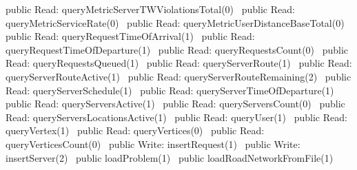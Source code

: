 public \LA{}Read: queryMetricServerTWViolationsTotal(0)~{\nwtagstyle{}}\RA{}
public \LA{}Read: queryMetricServiceRate(0)~{\nwtagstyle{}}\RA{}
public \LA{}Read: queryMetricUserDistanceBaseTotal(0)~{\nwtagstyle{}}\RA{}
public \LA{}Read: queryRequestTimeOfArrival(1)~{\nwtagstyle{}}\RA{}
public \LA{}Read: queryRequestTimeOfDeparture(1)~{\nwtagstyle{}}\RA{}
public \LA{}Read: queryRequestsCount(0)~{\nwtagstyle{}}\RA{}
public \LA{}Read: queryRequestsQueued(1)~{\nwtagstyle{}}\RA{}
public \LA{}Read: queryServerRoute(1)~{\nwtagstyle{}}\RA{}
public \LA{}Read: queryServerRouteActive(1)~{\nwtagstyle{}}\RA{}
public \LA{}Read: queryServerRouteRemaining(2)~{\nwtagstyle{}}\RA{}
public \LA{}Read: queryServerSchedule(1)~{\nwtagstyle{}}\RA{}
public \LA{}Read: queryServerTimeOfDeparture(1)~{\nwtagstyle{}}\RA{}
public \LA{}Read: queryServersActive(1)~{\nwtagstyle{}}\RA{}
public \LA{}Read: queryServersCount(0)~{\nwtagstyle{}}\RA{}
public \LA{}Read: queryServersLocationsActive(1)~{\nwtagstyle{}}\RA{}
public \LA{}Read: queryUser(1)~{\nwtagstyle{}}\RA{}
public \LA{}Read: queryVertex(1)~{\nwtagstyle{}}\RA{}
public \LA{}Read: queryVertices(0)~{\nwtagstyle{}}\RA{}
public \LA{}Read: queryVerticesCount(0)~{\nwtagstyle{}}\RA{}
\nwendcode{}\nwdocspar
{}
\nwenddocs{}\plusendmoddef
public \LA{}Write: insertRequest(1)~{\nwtagstyle{}}\RA{}
public \LA{}Write: insertServer(2)~{\nwtagstyle{}}\RA{}
public \LA{}loadProblem(1)~{\nwtagstyle{}}\RA{}
public \LA{}loadRoadNetworkFromFile(1)~{\nwtagstyle{}}\RA{}
\nwendcode{}\nwdocspar
{}
\nwenddocs{}\plusendmoddef
